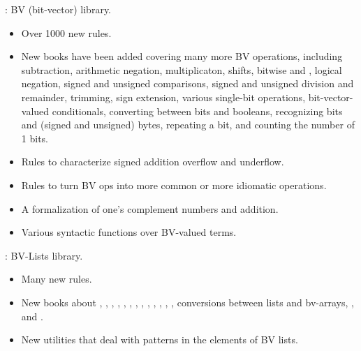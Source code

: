 
\begin{frame}

\implibtitle

:
BV (bit-vector) library.
\begin{itemize}
\item Over 1000 new rules.
\item New books have been added covering many more BV operations,
including subtraction, arithmetic negation, multiplicaton, shifts,
bitwise  and , logical negation, signed and
unsigned comparisons, signed and unsigned division and remainder,
trimming, sign extension, various single-bit operations,
bit-vector-valued conditionals, converting between bits and booleans,
recognizing bits and (signed and unsigned) bytes, repeating a bit, and
counting the number of 1 bits.
\item Rules to characterize signed addition overflow and underflow.
\item Rules to turn BV ops into more common or more idiomatic operations.
\item A formalization of one's complement numbers and addition.
\item Various syntactic functions over BV-valued terms.
\end{itemize}

\end{frame}


\begin{frame}

\implibtitle

:
BV-Lists library.

\begin{itemize}
\item Many new rules.
\item New books about , ,
, ,
, , ,
, , ,
, , ,
conversions between lists and bv-arrays, , and
.
\item New utilities that deal with patterns in the elements of BV lists.
\end{itemize}

\end{frame}

